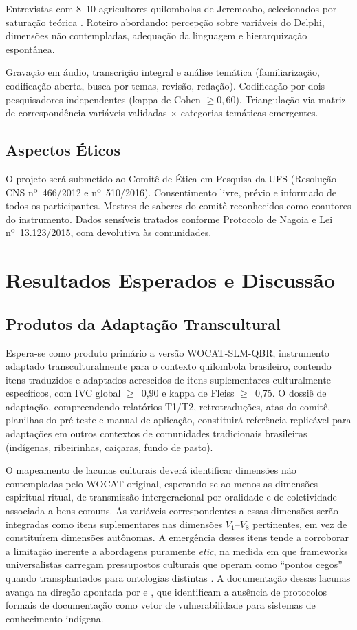 Entrevistas com 8--10 agricultores quilombolas de Jeremoabo, selecionados por saturação teórica \cite{Glaser1967}. Roteiro abordando: percepção sobre variáveis do Delphi, dimensões não contempladas, adequação da linguagem e hierarquização espontânea.

Gravação em áudio, transcrição integral e análise temática \cite{Braun2006} (familiarização, codificação aberta, busca por temas, revisão, redação). Codificação por dois pesquisadores independentes (kappa de Cohen $\geq 0,60$). Triangulação via matriz de correspondência variáveis validadas $\times$ categorias temáticas emergentes.

\subsection{Aspectos Éticos}

O projeto será submetido ao Comitê de Ética em Pesquisa da UFS (Resolução CNS nº~466/2012 e nº~510/2016). Consentimento livre, prévio e informado de todos os participantes. Mestres de saberes do comitê reconhecidos como coautores do instrumento. Dados sensíveis tratados conforme Protocolo de Nagoia e Lei nº~13.123/2015, com devolutiva às comunidades.


\section{Resultados Esperados e Discussão}

\subsection{Produtos da Adaptação Transcultural}

Espera-se como produto primário a versão WOCAT-SLM-QBR, instrumento adaptado transculturalmente para o contexto quilombola brasileiro, contendo itens traduzidos e adaptados acrescidos de itens suplementares culturalmente específicos, com IVC global $\geq$~0,90 e kappa de Fleiss $\geq$~0,75. O dossiê de adaptação, compreendendo relatórios T1/T2, retrotraduções, atas do comitê, planilhas do pré-teste e manual de aplicação, constituirá referência replicável para adaptações em outros contextos de comunidades tradicionais brasileiras (indígenas, ribeirinhas, caiçaras, fundo de pasto).

O mapeamento de lacunas culturais deverá identificar dimensões não contempladas pelo WOCAT original, esperando-se ao menos as dimensões espiritual-ritual, de transmissão intergeracional por oralidade e de coletividade associada a bens comuns. As variáveis correspondentes a essas dimensões serão integradas como itens suplementares nas dimensões $V_1$--$V_8$ pertinentes, em vez de constituírem dimensões autônomas. A emergência desses itens tende a corroborar a limitação inerente a abordagens puramente \textit{etic}, na medida em que frameworks universalistas carregam pressupostos culturais que operam como ``pontos cegos'' quando transplantados para ontologias distintas \cite{Herdman1999}. A documentação dessas lacunas avança na direção apontada por  e , que identificam a ausência de protocolos formais de documentação como vetor de vulnerabilidade para sistemas de conhecimento indígena.

